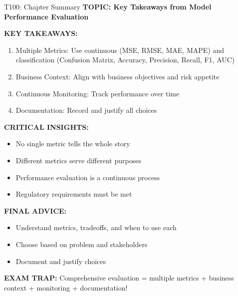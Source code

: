 \documentclass[8pt]{beamer}
\begin{document}
	\begin{frame}{T100: Chapter Summary}
		\fontsize{6.5}{7.5}\selectfont
		\textbf{TOPIC: Key Takeaways from Model Performance Evaluation}
		
		\vspace{0.1cm}
		\textbf{KEY TAKEAWAYS:}
		\begin{enumerate}
			\item \textcolor{myblue}{Multiple Metrics:} Use continuous (MSE, RMSE, MAE, MAPE) and classification (Confusion Matrix, Accuracy, Precision, Recall, F1, AUC)
			\item \textcolor{myblue}{Business Context:} Align with business objectives and risk appetite
			\item \textcolor{myblue}{Continuous Monitoring:} Track performance over time
			\item \textcolor{myblue}{Documentation:} Record and justify all choices
		\end{enumerate}
		
		\vspace{0.1cm}
		\textbf{CRITICAL INSIGHTS:}
		\begin{itemize}
			\item No single metric tells the whole story
			\item Different metrics serve different purposes
			\item Performance evaluation is a continuous process
			\item Regulatory requirements must be met
		\end{itemize}
		
		\vspace{0.1cm}
		\textbf{FINAL ADVICE:}
		\begin{itemize}
			\item Understand metrics, tradeoffs, and when to use each
			\item Choose based on problem and stakeholders
			\item Document and justify choices
		\end{itemize}
		
		\textcolor{myred}{\textbf{EXAM TRAP:}} Comprehensive evaluation = \textcolor{myblue}{multiple metrics + business context + monitoring + documentation}!
	\end{frame}
	
	
\end{document}
